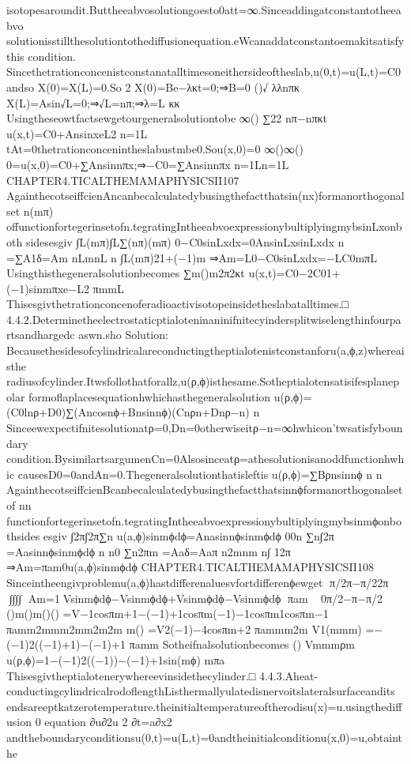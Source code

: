 {{{{isotopesaroundit.Buttheeabvosolutiongoesto0att=∞.Sinceaddingatconstantotheeabvo
solutionisstillthesolutiontothediffusionequation.eWcanaddatconstantoemakitsatisfythis
condition.
Sincethetrationconcenistconstanatalltimesoneithersideoftheslab,u(0,t)=u(L,t)=C0andso
X(0)=X(L)=0.So
2
X(0)=Be−λκt=0;⇒B=0
()√
λλnπκ
X(L)=Asin√L=0;⇒√L=nπ;⇒λ=L
κκ
Usingtheseowtfactsewgetourgeneralsolutiontobe
∞()
∑22
nπ−nπκt
u(x,t)=C0+AnsinxeL2
n=1L
tAt=0thetrationconcenintheslabustmbe0.Sou(x,0)=0
∞()∞()
0=u(x,0)=C0+∑Ansinnπx;⇒−C0=∑Ansinnπx
n=1Ln=1L
CHAPTER4.TICALTHEMAMAPHYSICSII107
AgainthecotseiffcienAncanbecalculatedybusingthefactthat{sin(nx)}formanorthogonalset
n(mπ)
offunctionfortegerinsetofn.tegratingIntheeabvoexpressionybultiplyingmybsinLxonboth
sidesesgiv
∫L(mπ)∫L∑(nπ)(mπ)
0−C0sinLxdx=0AnsinLxsinLxdx
n
=∑A1δ=Am
nLmnL
n{}
∫L(mπ)21+(−1)m
⇒Am=L0−C0sinLxdx=−LC0mπL
Usingthisthegeneralsolutionbecomes
∑m()m2π2κt
u(x,t)=C0−2C01+(−1)sinmπxe−L2
πmmL
Thisesgivthetrationconcenoferadioactivisotopeinsidetheslabatalltimes.□
4.4.2.Determinetheelectrostaticptialoteninaninifnitecyindersplitwiselengthinfourpartsandhargedc
aswn.sho
Solution:
Becausethesidesofcylindricalareconductingtheptialotenistconstanforu(a,ϕ,z)whereaisthe
radiusofcylinder.Itwsfollothatforallz,u(ρ,ϕ)isthesame.Sotheptialotensatisifesplanepolar
formoflaplacesequationhwhichasthegeneralsolution
u(ρ,ϕ)=(C0lnρ+D0)∑(Ancosnϕ+Bnsinnϕ)(Cnρn+Dnρ−n)
n
Sinceewexpectifnitesolutionatρ=0,Dn=0otherwiseitρ−n=∞hwhicon’twsatisfyboundary
condition.BysimilartsargumenCn=0Alsosinceatρ=athesolutionisanoddfunctionhwhic
causesD0=0andAn=0.Thegeneralsolutionthatisleftis
u(ρ,ϕ)=∑Bρnsinnϕ
n
n
AgainthecotseiffcienBcanbecalculatedybusingthefactthat{sinnϕ}formanorthogonalsetof
nn
functionfortegerinsetofn.tegratingIntheeabvoexpressionybultiplyingmybsinmϕonbothsides
esgiv
∫2π∫2π∑n
u(a,ϕ)sinmϕdϕ=Anasinnϕsinmϕdϕ
00n
∑n∫2π
=Aasinnϕsinmϕdϕ
n
n0
∑n2πm
=Aaδ=Aaπ
n2mnm
n∫
12π
⇒Am=πam0u(a,ϕ)sinmϕdϕ
CHAPTER4.TICALTHEMAMAPHYSICSII108
Sinceintheengivproblemu(a,ϕ)hastdifferenaluesvfortdifferenϕewget
π/2π−π/22π
∫∫∫∫
Am=1Vsinmϕdϕ−Vsinmϕdϕ+Vsinmϕdϕ−Vsinmϕdϕ
πam
0π/2−π−π/2
{()m()m()()}
=V−1cosπm+1−(−1)+1cosπm(−1)−1cosπm1cosπm−1
πamm2mmm2mm2m2m
{m()}
=V2(−1)−4cosπm+2
πammm2m
{}
V1(mmm)
=−(−1)2((−1)+1)−(−1)+1
πamm
Sotheifnalsolutionbecomes
{}()
Vmmmρm
u(ρ,ϕ)=1−(−1)2((−1))−(−1)+1sin(mϕ)
mπa
Thisesgivtheptialotenerywhereevinsidethecylinder.□
4.4.3.Aheat-conductingcylindricalrodoflengthListhermallyulatedisnervoitslateralsurfaceandits
endsareeptkatzerotemperature.theinitialtemperatureoftherodisu(x)=u.usingthediffusion
0
equation
∂u∂2u
2
∂t=a∂x2
andtheboundaryconditionsu(0,t)=u(L,t)=0andtheinitialconditionu(x,0)=u,obtainthe
}}}}
